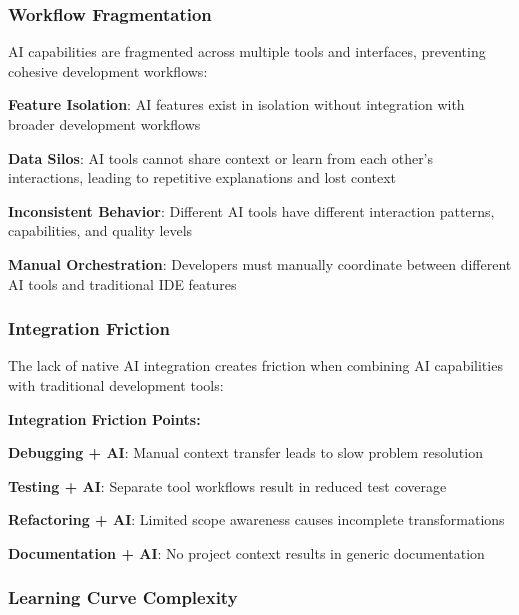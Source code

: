 \subsubsection{Workflow Fragmentation}

AI capabilities are fragmented across multiple tools and interfaces, preventing cohesive development workflows:

\begin{expandedlist}
    \item \textbf{Feature Isolation}: AI features exist in isolation without integration with broader development workflows
    
    \item \textbf{Data Silos}: AI tools cannot share context or learn from each other's interactions, leading to repetitive explanations and lost context
    
    \item \textbf{Inconsistent Behavior}: Different AI tools have different interaction patterns, capabilities, and quality levels
    
    \item \textbf{Manual Orchestration}: Developers must manually coordinate between different AI tools and traditional IDE features
\end{expandedlist}

\subsubsection{Integration Friction}

The lack of native AI integration creates friction when combining AI capabilities with traditional development tools:

\textbf{Integration Friction Points:}

\begin{compactlist}
    \item \textbf{Debugging + AI}: Manual context transfer leads to slow problem resolution
    \item \textbf{Testing + AI}: Separate tool workflows result in reduced test coverage
    \item \textbf{Refactoring + AI}: Limited scope awareness causes incomplete transformations
    \item \textbf{Documentation + AI}: No project context results in generic documentation
\end{compactlist}

\subsubsection{Learning Curve Complexity}

